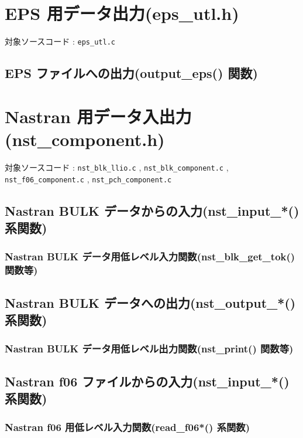 \documentclass[a4paper,10pt]{jarticle}
\begin{document}

\section{EPS 用データ出力(eps\_utl.h)}
対象ソースコード : \verb|eps_utl.c|

\subsection{EPS ファイルへの出力(output\_eps() 関数)}


\section{Nastran 用データ入出力(nst\_component.h)}
対象ソースコード : \verb|nst_blk_llio.c| , \verb|nst_blk_component.c| ,
  \verb|nst_f06_component.c| , \verb|nst_pch_component.c|

\subsection{Nastran BULK データからの入力(nst\_input\_*() 系関数)}
\subsubsection{Nastran BULK データ用低レベル入力関数(nst\_blk\_get\_tok() 関数等)}

\subsection{Nastran BULK データへの出力(nst\_output\_*() 系関数)}
\subsubsection{Nastran BULK データ用低レベル出力関数(nst\_print() 関数等)}

\subsection{Nastran f06 ファイルからの入力(nst\_input\_*() 系関数)}
\subsubsection{Nastran f06 用低レベル入力関数(read\_f06*() 系関数)}
\end{document}
